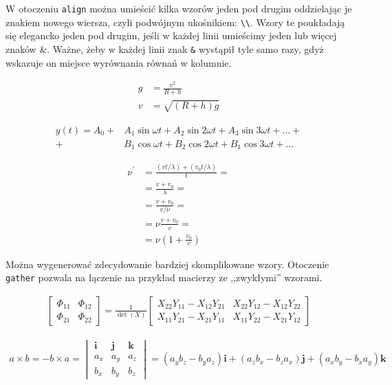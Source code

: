 W otoczeniu \texttt{align} można umieścić kilka wzorów jeden pod drugim oddzielając je znakiem nowego wiersza, czyli podwójnym ukośnikiem: \texttt{\textbackslash{}\textbackslash{}}. Wzory te poukładają się elegancko jeden pod drugim, jeśli w każdej linii umieścimy jeden lub więcej znaków \&. Ważne, żeby w każdej linii znak \texttt{\&} wystąpił tyle samo razy, gdyż wskazuje on miejsce wyrównania równań w kolumnie.

\begin{align}
    g & = \frac{v^2}{R+h} \\
    v & = \sqrt{ \left( R+h \right) g }
\end{align}

\begin{align}
 y(t) = A_0
 +& A_1 \sin \omega t +
    A_2 \sin 2 \omega t +
    A_3 \sin 3 \omega t + \ldots + \nonumber \\
 +& B_1 \cos \omega t +
    B_2 \cos 2 \omega t +
    B_1 \cos 3 \omega t + \ldots
\end{align}

\begin{align}
 \nu^\prime  &= \frac{\left(vt / \lambda \right) + \left( v_0t / \lambda \right)}{t} = \nonumber\\
            &= \frac{v + v_0}{\lambda} = \nonumber\\
            &= \frac{v + v_0}{v / \nu} = \nonumber\\
            &= \nu \frac{v+v_0}{v} = \nonumber\\
            &= \nu \left( 1 + \frac{v_0}{v} \right)
\end{align}

Można wygenerować zdecydowanie bardziej skomplikowane wzory. Otoczenie \texttt{gather} pozwala na łączenie na przykład macierzy ze ,,zwykłymi'' wzorami.

\begin{gather}
 \begin{bmatrix} \Phi_{11} & \Phi_{12} \\ \Phi_{21} & \Phi_{22} \end{bmatrix}
 =
 \frac{1}{\det(X)}
  \begin{bmatrix}
   X_{22} Y_{11} - X_{12} Y_{21} &
   X_{22} Y_{12} - X_{12} Y_{22} \\
   X_{11} Y_{21} - X_{21} Y_{11} &
   X_{11} Y_{22} - X_{21} Y_{12}
   \end{bmatrix}
\end{gather}

\begin{gather}
a \times b = -b \times a =
\begin{vmatrix}
\pmb{i}    &     \pmb{j}      &      \pmb{k}    \\
a_x        &     a_y          &      a_z        \\
b_x        &     b_y          &      b_z
\end{vmatrix}
= \left(a_y b_z - b_y a_z \right)\pmb{i}
+ \left(a_z b_x - b_z a_x \right)\pmb{j}
+ \left(a_x b_y - b_x a_y \right)\pmb{k}
\end{gather}

